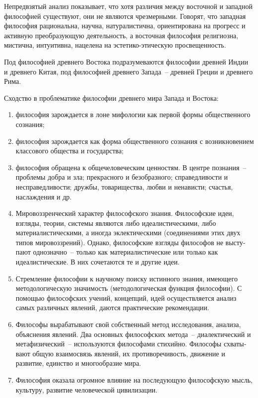 
Непредвзятый анализ показывает, что хотя различия между восточной и западной филосо­фией существуют,
они не являются чрезмерными. Говорят, что западная философия рациональна, научна, натуралистична,
ориентирована на прогресс и активную преобразующую деятельность, а восточная философия религиозна,
мистична, ин­туитивна, нацелена на эстетико-этическую просвещенность.

Под философией древнего Востока подразумеваются философии древ­ней Индии и древ­него Китая, под
философией древнего Запада~-- древней Греции и древнего Рима.

Сходство в проблематике философии древнего мира Запада и Востока:
\begin{enumerate}
    \vspace*{-2ex}
    \itemsep-1ex
    \item философия за­рождается в лоне мифологии как первой формы общест­венного созна­ния;
    \item философия зарождается как форма общественного сознания с возник­новением клас­сового
        общества и государства;
    \item философия обращена к общечеловеческим ценностям. В центре познания~-- проблемы
        добра и зла; прекрасного и безобраз­ного; справедливо­сти и несправедливости; дружбы,
        товарищества, любви и ненависти; счастья, наслаждения и др.
    \item Мировоззренче­ский характер философского знания. Философские идеи, взгляды, теории,
        системы являются либо идеалисти­ческими, либо материалистическими, а иногда
        эклектическими (со­едине­ниями этих двух типов мировоззре­ний). Однако, философские
        взгляды философов не высту­пают однозначно~-- только как мате­риалистические или только
        как идеалистические. В них сочетаются те и другие идеи.
    \item Стремление философии к научному поиску истинного зна­ния, имею­щего методоло­гическую
        значимость (методологическая функция филосо­фии). С помощью философских учений,
        концепций, идей осуществляется ана­лиз самых раз­личных явлений, даются практические
        рекомендации.
    \item Философы вырабатывают свой собственный метод исследования, ана­лиза, объясне­ния
        явлений. Два основных философских метода~-- диа­лектический и метафизиче­ский~--
        использу­ются философами стихийно. Философы схваты­вают общую взаимосвязь явлений, их
        противоречивость, движение и развитие, единство и многообразие мира.
    \item Философия оказала огромное влияние на последующую философ­скую мысль, куль­туру,
        развитие человеческой цивилизации.
    \vspace*{-2ex}
\end{enumerate}

